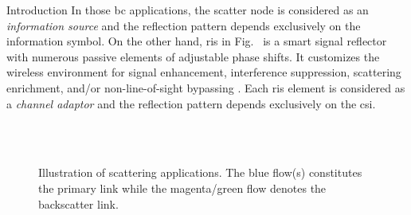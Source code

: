 \documentclass[journal]{IEEEtran}
\begin{document}
\begin{section}{Introduction}
	In those \gls{bc} applications, the scatter node is considered as an \emph{information source} and the reflection pattern depends exclusively on the information symbol.
	On the other hand, \gls{ris} in Fig.~ is a smart signal reflector with numerous passive elements of adjustable phase shifts.
	It customizes the wireless environment for signal enhancement, interference suppression, scattering enrichment, and/or non-line-of-sight bypassing \cite{Wu2021b}.
	Each \gls{ris} element is considered as a \emph{channel adaptor} and the reflection pattern depends exclusively on the \gls{csi}.

	\begin{figure}[!t]
		\centering
		\\
		\subfloat[\gls{sr}]{
			\resizebox{0.48\linewidth}{!}{
				
			}
			\label{fg:sr}
		}
		\\
		\subfloat[RIScatter]{
			\resizebox{0.48\linewidth}{!}{
				
			}
			\label{fg:riscatter}
		}
		\caption{
			Illustration of scattering applications.
			The blue flow(s) constitutes the primary link while the magenta/green flow denotes the backscatter link.
		}
		\label{fg:scatter_illustration}
	\end{figure}


\end{section}
\end{document}

